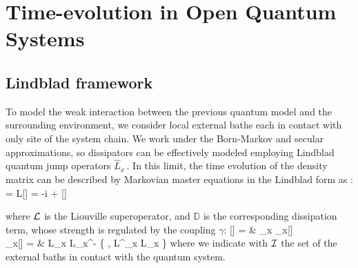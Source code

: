 \section{Time-evolution in Open Quantum Systems}


\subsection{Lindblad framework}

To model the weak interaction between the previous quantum model and the surrounding
environment, we consider local external baths each in contact with only site of the system
chain. We work under the Born-Markov and secular approximations, so dissipators 
can be effectively modeled employing Lindblad quantum jump operators $\hat L_x\,$. 
In this limit, the time evolution of the density matrix can be described by Markovian
master equations in the Lindblad form as \cite{BP-openquantumsystembook, TV-2021-dissipativeboundaries, TV-2022-localizedparticleloss}:
	 = {\cal L}[\rho] = 
		-i  +  \pc
\ea

where ${\cal L}$ is the Liouville superoperator, and $\mathbb{D}$ is the corresponding 
dissipation term, whose strength is regulated by the coupling $\gamma$:
	[\rho] = & \gamma \sum_{x } 
		_x[\rho] \cm \\
	_x[\rho] = &
		\hat L_x \rho \hat L_x^\dagger - 
		 \Bigl\{ \rho, \hat L^\dagger_x \hat L_x \Bigl\} \pc
\ea
where we indicate with ${\cal I}$ the set of the external baths in contact with the
quantum system.

